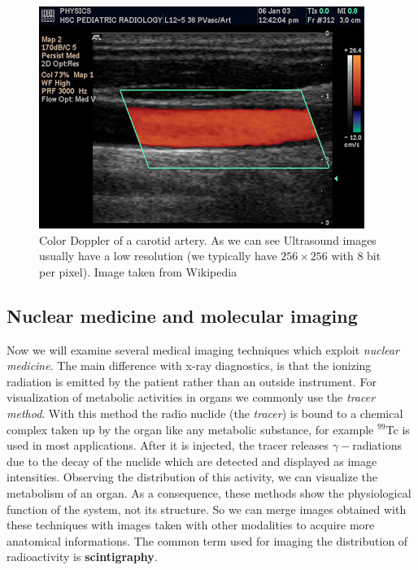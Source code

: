 \begin{figure}[htb] %
   \centering
   \includegraphics[width=0.40\linewidth]{images/ColourDopplerA.jpg}
   \caption[Color Doppler]{Color Doppler of a carotid artery. As we can see Ultrasound images usually have a low resolution (we typically have $256\times256$ with 8 bit per pixel). Image taken from Wikipedia}
   \label{fig:ultrasound}
\end{figure}

\subsection{Nuclear medicine and molecular imaging}

Now we will examine several medical imaging techniques which exploit \textit{nuclear medicine}. The main difference with x-ray diagnostics, is that the ionizing radiation is emitted by the patient rather than an outside instrument. For visualization of metabolic activities in organs we commonly use the \textit{tracer method}. With this method the radio nuclide (the \textit{tracer}) is bound to a chemical complex taken up by the organ like any metabolic substance, for example $^{99}$Tc is used in most applications. After it is injected, the tracer releases $\gamma-$radiations due to the decay of the nuclide which are detected and displayed as image intensities. Observing the distribution of this activity, we can visualize the metabolism of an organ. As a consequence, these methods show the physiological function of the system, not its structure. So we can merge images obtained with these techniques with images taken with other modalities to acquire more anatomical informations. The common term used for imaging the distribution of radioactivity is \textbf{scintigraphy}.\\

